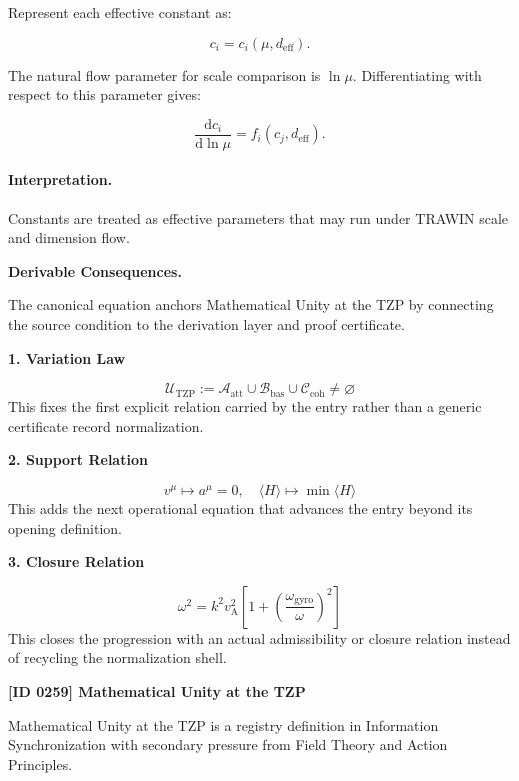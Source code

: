 Represent each effective constant as:

\begin{equation}
c_i=c_i(\mu,d_{\mathrm{eff}}).
\end{equation}

The natural flow parameter for scale comparison is $\ln\mu$.  
Differentiating with respect to this parameter gives:

\begin{equation}
\boxed{
\frac{\mathrm{d}c_i}{\mathrm{d}\ln\mu}
=
f_i(c_j,d_{\mathrm{eff}}).
}
\end{equation}

\paragraph{Interpretation.}
Constants are treated as effective parameters that may run under TRAWIN scale and dimension flow.

\par\vspace{0.35em}
\noindent\textbf{Derivable Consequences.}\quad
\begingroup
\footnotesize
\raggedright
The canonical equation anchors Mathematical Unity at the TZP by connecting the source condition to the derivation layer and proof certificate.
\par\endgroup

\noindent\textbf{1. Variation Law}\par
\[
\mathcal{U}_{\mathrm{TZP}}
:=
\mathcal{A}_{\mathrm{att}}\cup\mathcal{B}_{\mathrm{bas}}\cup\mathcal{C}_{\mathrm{coh}}
\neq\varnothing
\]
\noindent This fixes the first explicit relation carried by the entry rather than a generic certificate record normalization.\par
\noindent\textbf{2. Support Relation}\par
\[
v^{\mu}\longmapsto a^{\mu}=0,\quad
\langle H\rangle\longmapsto \min\langle H\rangle
\]
\noindent This adds the next operational equation that advances the entry beyond its opening definition.\par
\noindent\textbf{3. Closure Relation}\par
\[
\omega^{2} = k^{2} v_{\mathrm{A}}^{2}\left[1 + \left(\frac{\omega_{\mathrm{gyro}}}{\omega}\right)^{2}\right]
\]
\noindent This closes the progression with an actual admissibility or closure relation instead of recycling the normalization shell.\par

\clearpage
\noindent\textbf{[ID 0259] Mathematical Unity at the TZP}\par
\vspace{0.35em}
\begingroup\small
{}
Mathematical Unity at the TZP is a registry definition in Information Synchronization with secondary pressure from Field Theory and Action Principles.

